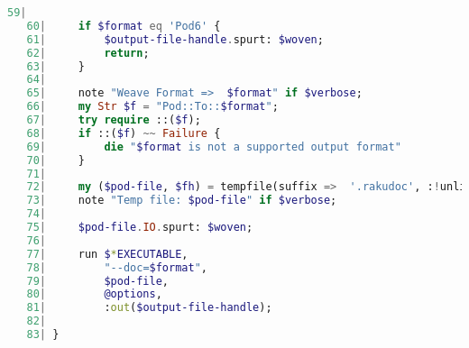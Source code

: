 \documentclass{scrartcl}
\begin{document}
\begin{lstlisting}[language=Raku]
   59| 
   60|     if $format eq 'Pod6' {
   61|         $output-file-handle.spurt: $woven;
   62|         return;
   63|     } 
   64| 
   65|     note "Weave Format =>  $format" if $verbose;
   66|     my Str $f = "Pod::To::$format";
   67|     try require ::($f);
   68|     if ::($f) ~~ Failure {
   69|         die "$format is not a supported output format"
   70|     } 
   71| 
   72|     my ($pod-file, $fh) = tempfile(suffix =>  '.rakudoc', :!unlink);
   73|     note "Temp file: $pod-file" if $verbose;
   74| 
   75|     $pod-file.IO.spurt: $woven;
   76| 
   77|     run $*EXECUTABLE,
   78|         "--doc=$format",
   79|         $pod-file,
   80|         @options,
   81|         :out($output-file-handle);
   82| 
   83| } 

\end{lstlisting}
\end{document}
